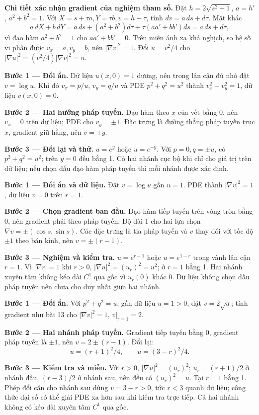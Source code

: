 \textbf{Chi tiết xác nhận gradient của nghiệm tham số.} Đặt $h=2\sqrt{s^2+1}$, $a=h'$, $a^2+b^2=1$. Với $X=s+\tau a,Y=\tau b,v=h+\tau$, tính $dv=a\,ds+d\tau$. Mặt khác
\[a\,dX+b\,dY=a\,ds+(a^2+b^2)d\tau+\tau(aa'+bb')ds=a\,ds+d\tau,\]
vì đạo hàm $a^2+b^2=1$ cho $aa'+bb'=0$. Trên miền ánh xạ khả nghịch, so hệ số vi phân được $v_x=a,v_y=b$, nên $|\nabla v|^2=1$. Đổi $u=v^2/4$ cho $|\nabla u|^2=(v^2/4)|\nabla v|^2=u$.

\textbf{Bước 1 — Đổi ẩn.} Dữ liệu $u(x,0)=1$ dương, nên trong lân cận đủ nhỏ đặt $v=\log u$. Khi đó $v_x=p/u$, $v_y=q/u$ và PDE $p^2+q^2=u^2$ thành $v_x^2+v_y^2=1$, dữ liệu $v(x,0)=0$.

\textbf{Bước 2 — Hai hướng pháp tuyến.} Đạo hàm theo $x$ của vết bằng 0, nên $v_x=0$ trên dữ liệu; PDE cho $v_y=\pm1$. Đặc trưng là đường thẳng pháp tuyến trục $x$, gradient giữ hằng, nên $v=\pm y$.

\textbf{Bước 3 — Đổi lại và thử.} $u=e^y$ hoặc $u=e^{-y}$. Với $p=0,q=\pm u$, có $p^2+q^2=u^2$; trên $y=0$ đều bằng 1. Có hai nhánh cục bộ khi chỉ cho giá trị trên dữ liệu; nếu chọn dấu đạo hàm pháp tuyến thì mỗi nhánh được xác định.

\textbf{Bước 1 — Đổi ẩn và dữ liệu.} Đặt $v=\log u$ gần $u=1$. PDE thành $|\nabla v|^2=1$, dữ liệu $v=0$ trên $r=1$.

\textbf{Bước 2 — Chọn gradient ban đầu.} Đạo hàm tiếp tuyến trên vòng tròn bằng 0, nên gradient phải theo pháp tuyến. Độ dài 1 cho hai lựa chọn $\nabla v=\pm(\cos s,\sin s)$. Các đặc trưng là tia pháp tuyến và $v$ thay đổi với tốc độ $\pm1$ theo bán kính, nên $v=\pm(r-1)$.

\textbf{Bước 3 — Nghiệm và kiểm tra.} $u=e^{r-1}$ hoặc $u=e^{1-r}$ trong vành lân cận $r=1$. Vì $|\nabla r|=1$ khi $r>0$, $|\nabla u|^2=(u_r)^2=u^2$; ở $r=1$ bằng 1. Hai nhánh xuyên tâm không kéo dài $C^1$ qua gốc vì $u_r(0)$ khác 0. Dữ liệu không chọn dấu pháp tuyến nên chưa cho duy nhất giữa hai nhánh.

\textbf{Bước 1 — Đổi ẩn.} Với $p^2+q^2=u$, gần dữ liệu $u=1>0$, đặt $v=2\sqrt u$; tính gradient như bài 13 cho $|\nabla v|^2=1$, $v|_{r=1}=2$.

\textbf{Bước 2 — Hai nhánh pháp tuyến.} Gradient tiếp tuyến bằng 0, gradient pháp tuyến là $\pm1$, nên $v=2\pm(r-1)$. Đổi lại:
\[u=(r+1)^2/4,\qquad u=(3-r)^2/4.\]

\textbf{Bước 3 — Kiểm tra và miền.} Với $r>0$, $|\nabla u|^2=(u_r)^2$; $u_r=(r+1)/2$ ở nhánh đầu, $(r-3)/2$ ở nhánh sau, nên đều có $(u_r)^2=u$. Tại $r=1$ bằng 1. Phép đổi căn cho nhánh sau dùng $v=3-r>0$, tức $r<3$ quanh dữ liệu; công thức đại số có thể giải PDE xa hơn sau khi kiểm tra trực tiếp. Cả hai nhánh không có kéo dài xuyên tâm $C^1$ qua gốc.

